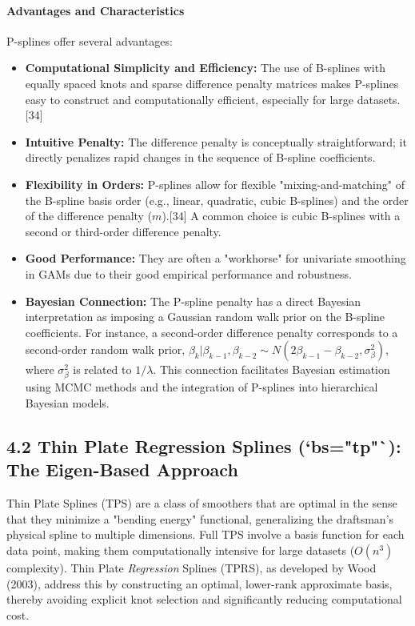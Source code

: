 \documentclass[11pt, a4paper]{article}
\begin{document}
\begin{itemize}
\paragraph{Advantages and Characteristics}
P-splines offer several advantages:
\begin{itemize}
 \item \textbf{Computational Simplicity and Efficiency:} The use of B-splines with equally spaced knots and sparse difference penalty matrices makes P-splines easy to construct and computationally efficient, especially for large datasets.[34]
 \item \textbf{Intuitive Penalty:} The difference penalty is conceptually straightforward; it directly penalizes rapid changes in the sequence of B-spline coefficients.
 \item \textbf{Flexibility in Orders:} P-splines allow for flexible "mixing-and-matching" of the B-spline basis order (e.g., linear, quadratic, cubic B-splines) and the order of the difference penalty ($m$).[34] A common choice is cubic B-splines with a second or third-order difference penalty.
 \item \textbf{Good Performance:} They are often a "workhorse" for univariate smoothing in GAMs due to their good empirical performance and robustness.
 \item \textbf{Bayesian Connection:} The P-spline penalty has a direct Bayesian interpretation as imposing a Gaussian random walk prior on the B-spline coefficients. For instance, a second-order difference penalty corresponds to a second-order random walk prior, $ \beta_k | \beta_{k-1}, \beta_{k-2} \sim N(2\beta_{k-1} - \beta_{k-2}, \sigma_\beta^2) $, where $\sigma_\beta^2$ is related to $1/\lambda$. This connection facilitates Bayesian estimation using MCMC methods and the integration of P-splines into hierarchical Bayesian models.
\end{itemize}


\subsection{4.2 Thin Plate Regression Splines (`bs="tp"`): The Eigen-Based Approach}
Thin Plate Splines (TPS) are a class of smoothers that are optimal in the sense that they minimize a "bending energy" functional, generalizing the draftsman's physical spline to multiple dimensions. Full TPS involve a basis function for each data point, making them computationally intensive for large datasets ($O(n^3)$ complexity). Thin Plate \textit{Regression} Splines (TPRS), as developed by Wood (2003), address this by constructing an optimal, lower-rank approximate basis, thereby avoiding explicit knot selection and significantly reducing computational cost.


\end{itemize}
\end{document}
